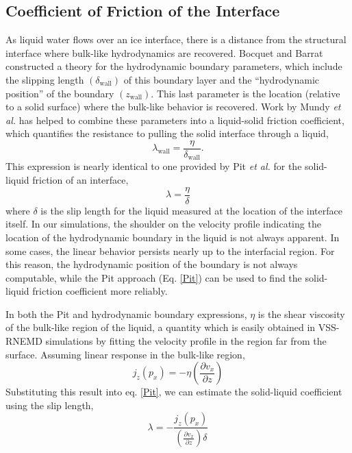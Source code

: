 \subsection{Coefficient of Friction of the Interface}
As liquid water flows over an ice interface, there is a distance from
the structural interface where bulk-like hydrodynamics are recovered.
Bocquet and Barrat constructed a theory for the hydrodynamic boundary
parameters, which include the slipping length
$\left(\delta_\mathrm{wall}\right)$ of this boundary layer and the
``hydrodynamic position'' of the boundary
$\left(z_\mathrm{wall}\right)$.\cite{PhysRevLett.70.2726,PhysRevE.49.3079}
This last parameter is the location (relative to a solid surface)
where the bulk-like behavior is recovered.  Work by Mundy {\it et al.}
has helped to combine these parameters into a liquid-solid friction
coefficient, which quantifies the resistance to pulling the solid
interface through a liquid,\cite{Mundy1997305}
\begin{equation}
\lambda_\mathrm{wall} = \frac{\eta}{\delta_\mathrm{wall}}.
\end{equation}
This expression is nearly identical to one provided by Pit {\it et
  al.} for the solid-liquid friction of an interface,\cite{Pit99}
\begin{equation}\label{Pit}
  \lambda=\frac{\eta}{\delta}
\end{equation}
where $\delta$ is the slip length for the liquid measured at the
location of the interface itself.  In our simulations, the shoulder on
the velocity profile indicating the location of the hydrodynamic
boundary in the liquid is not always apparent. In some cases, the
linear behavior persists nearly up to the interfacial region.  For
this reason, the hydrodynamic position of the boundary is not always
computable, while the Pit approach (Eq. \ref{Pit}) can be used to find
the solid-liquid friction coefficient more reliably.

In both the Pit and hydrodynamic boundary expressions, $\eta$ is the
shear viscosity of the bulk-like region of the liquid, a quantity
which is easily obtained in VSS-RNEMD simulations by fitting the
velocity profile in the region far from the surface.\cite{Kuang12}
Assuming linear response in the bulk-like region,
\begin{equation}\label{Kuang}
j_{z}(p_{x})=-\eta \left(\frac{\partial v_{x}}{\partial z}\right)
\end{equation}
Substituting this result into eq. \eqref{Pit}, we can estimate the
solid-liquid coefficient using the slip length,
\begin{equation}
\lambda=-\frac{j_{z}(p_{x})} {\left(\frac{\partial v_{x}}{\partial
      z}\right) \delta}
\end{equation}


